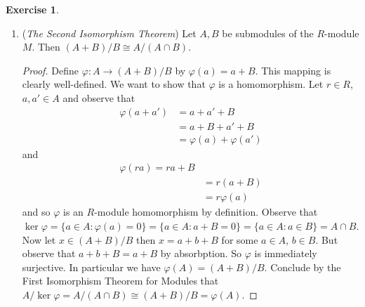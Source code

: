 \documentclass[8pt]{amsart}
\theoremstyle{plain}%
\theoremstyle{definition}
\newtheorem*{exercise}{Exercise}%
\theoremstyle{remark}
\numberwithin{equation}{section}
\begin{document}
\begin{exercise}
\begin{enumerate}
\begin{proof}
				Now we must show that $\Phi$ is an $R$-module homomorphism. Let $x, y \in M/\ker\varphi$ where $x = m + \ker\varphi$ and $y = m' + \ker\varphi$ for some $m, m' \in M$ and let $r \in R$. Observe that
				\begin{align*}
					\Phi(x + y)&= \Phi(m + m' + \ker\varphi)\\
					&= \varphi(m + m')\\
					&= \varphi(m) + \varphi(m')\\
					&= \Phi(m + \ker\varphi) + \Phi(m' + \ker\varphi)\\
					&= \Phi(x) + \Phi(y)
				\end{align*}
				and
				\begin{align*}
					\Phi(rx) &= \Phi(r(m + \ker\varphi))\\
					&= \Phi(rm + \ker\varphi)\\ %
					&= \varphi(rm)\\
					&= r\varphi(m)\\
					&= r\Phi(m + \ker\varphi)\\
					&= r\Phi(x)
				\end{align*}
				Hence we have shown that $\Phi$ is a well-defined bijective homomorphism and thus we can conclude by definition of $R$-module isomorphism that $M/\ker\varphi \cong \varphi(M)$.
			\end{proof}
		\item (\textit{The Second Isomorphism Theorem}) Let $A, B$ be submodules of the $R$-module $M$. Then $(A + B)/B \cong A/(A \cap B)$.
			\begin{proof}
				Define $\varphi : A \to (A + B)/B$ by $\varphi(a) = a + B$. This mapping is clearly well-defined. We want to show that $\varphi$ is a homomorphism. Let $r \in R$, $a, a' \in A$ and observe that
					\begin{align*}
						\varphi(a + a') &= a + a' + B\\
						&= a + B + a' + B\\
						&= \varphi(a) + \varphi(a')
					\end{align*}
					and
					\begin{align*}
						\varphi(ra) = ra + B\\
						&= r(a + B)\\
						&= r\varphi(a)
					\end{align*}
					and so $\varphi$ is an $R$-module homomorphism by definition. Observe that $\ker \varphi = \{a \in A : \varphi(a) = 0\} = \{a \in A : a + B = 0\} = \{a \in A : a \in B\} = A \cap B$. Now let $x \in (A + B)/B$ then $x = a + b + B$ for some $a \in A$, $b \in B$. But observe that $a + b + B = a + B$ by absorbption. So $\varphi$ is immediately surjective. In particular we have $\varphi(A) = (A + B)/B$. Conclude by the First Isomorphism Theorem for Modules that $A/\ker \varphi = A/(A \cap B) \cong (A + B)/B = \varphi(A)$.

\end{proof}
\end{enumerate}
\end{exercise}
\end{document}
